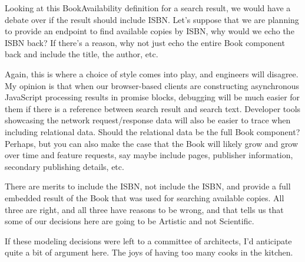 Looking at this BookAvailability definition for a search result, we would have a debate over if the result should include ISBN.  Let's suppose that we are planning to provide an endpoint to find available copies by ISBN, why would we echo the ISBN back?  If there's a reason, why not just echo the entire Book component back and include the title, the author, etc.

Again, this is where a choice of style comes into play, and engineers will disagree.  My opinion is that when our browser-based clients are constructing asynchronous JavaScript processing results in promise blocks, debugging will be much easier for them if there is a reference between search result and search text.  Developer tools showcasing the network request/response data will also be easier to trace when including relational data.  Should the relational data be the full Book component?  Perhaps, but you can also make the case that the Book will likely grow and grow over time and feature requests, say maybe include pages, publisher information, secondary publishing details, etc.

There are merits to include the ISBN, not include the ISBN, and provide a full embedded result of the Book that was used for searching available copies.  All three are right, and all three have reasons to be wrong, and that tells us that some of our decisions here are going to be Artistic and not Scientific.

If these modeling decisions were left to a committee of architects, I'd anticipate quite a bit of argument here.  The joys of having too many cooks in the kitchen.  
